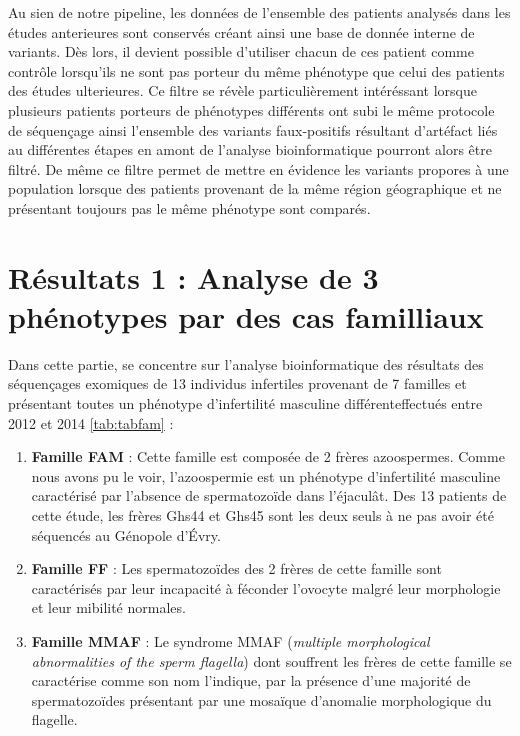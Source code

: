 \documentclass[12pt,twoside]{reedthesis}
\providecommand{\tightlist}{%
  \setlength{\itemsep}{0pt}\setlength{\parskip}{0pt}}
\theoremstyle{definition}
\theoremstyle{definition}
\theoremstyle{remark}
\begin{document}
\begin{enumerate}
    Au sien de notre pipeline, les données de l'ensemble des patients
    analysés dans les études anterieures sont conservés créant ainsi une
    base de donnée interne de variants. Dès lors, il devient possible
    d'utiliser chacun de ces patient comme contrôle lorsqu'ils ne sont pas
    porteur du même phénotype que celui des patients des études
    ulterieures. Ce filtre se révèle particulièrement intéréssant lorsque
    plusieurs patients porteurs de phénotypes différents ont subi le même
    protocole de séquençage ainsi l'ensemble des variants faux-positifs
    résultant d'artéfact liés au différentes étapes en amont de l'analyse
    bioinformatique pourront alors être filtré. De même ce filtre permet
    de mettre en évidence les variants propores à une population lorsque
    des patients provenant de la même région géographique et ne présentant
    toujours pas le même phénotype sont comparés.
  \end{enumerate}
  
  \newpage
  
  \section{Résultats 1 : Analyse de 3 phénotypes par des cas
  familliaux}\label{resultats-1-analyse-de-3-phenotypes-par-des-cas-familliaux}
  
  Dans cette partie, se concentre sur l'analyse bioinformatique des
  résultats des séquençages exomiques de 13 individus infertiles provenant
  de 7 familles et présentant toutes un phénotype d'infertilité masculine
  différenteffectués entre 2012 et 2014 \ref{tab:tabfam} :
  
  \begin{enumerate}
  \def\labelenumi{\arabic{enumi}.}
  \tightlist
  \item
    \textbf{Famille FAM} : Cette famille est composée de 2 frères
    azoospermes. Comme nous avons pu le voir, l'azoospermie est un
    phénotype d'infertilité masculine caractérisé par l'absence de
    spermatozoïde dans l'éjaculât. Des 13 patients de cette étude, les
    frères Ghs44 et Ghs45 sont les deux seuls à ne pas avoir été séquencés
    au Génopole d'Évry.\\
  \item
    \textbf{Famille FF} : Les spermatozoïdes des 2 frères de cette famille
    sont caractérisés par leur incapacité à féconder l'ovocyte malgré leur
    morphologie et leur mibilité normales.\\
  \item
    \textbf{Famille MMAF} : Le syndrome MMAF (\emph{multiple morphological
    abnormalities of the sperm flagella}) dont souffrent les frères de
    cette famille se caractérise comme son nom l'indique, par la présence
    d'une majorité de spermatozoïdes présentant par une mosaïque
    d'anomalie morphologique du flagelle.
  \end{enumerate}
  
\end{document}
